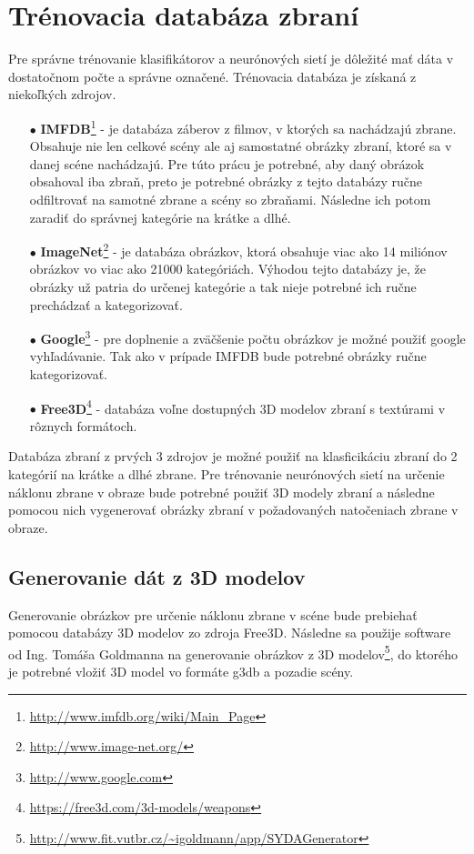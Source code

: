 
\section{Trénovacia databáza zbraní}
\label{sec:databaza}
Pre správne trénovanie klasifikátorov a neurónových sietí je dôležité mať dáta v dostatočnom počte a správne označené.
Trénovacia databáza je získaná z niekoľkých zdrojov.
\begin{enumerate}
    \item[$\bullet$] \textbf{IMFDB}\footnote{\url{http://www.imfdb.org/wiki/Main_Page}} - je databáza záberov z filmov, v ktorých sa nachádzajú zbrane.
    Obsahuje nie len celkové scény ale aj samostatné obrázky zbraní, ktoré sa v danej scéne nachádzajú.
    Pre túto prácu je potrebné, aby daný obrázok obsahoval iba zbraň, preto je potrebné obrázky z tejto databázy ručne odfiltrovať na samotné zbrane a scény so zbraňami.
    Následne ich potom zaradiť do správnej kategórie na krátke a dlhé.
    \item[$\bullet$] \textbf{ImageNet}\footnote{\url{http://www.image-net.org/}} - je databáza obrázkov, ktorá obsahuje viac ako 14 miliónov obrázkov vo viac ako 21000 kategóriách.
    Výhodou tejto databázy je, že obrázky už patria do určenej kategórie a tak nieje potrebné ich ručne prechádzať a kategorizovať.
    \item[$\bullet$] \textbf{Google}\footnote{\url{http://www.google.com}} - pre doplnenie a zväčšenie počtu obrázkov je možné použiť google vyhľadávanie.
    Tak ako v prípade IMFDB bude potrebné obrázky ručne kategorizovať.
    \item[$\bullet$] \textbf{Free3D}\footnote{\url{https://free3d.com/3d-models/weapons}} - databáza voľne dostupných 3D modelov zbraní s textúrami v rôznych formátoch.
\end{enumerate}

Databáza zbraní z prvých 3 zdrojov je možné použiť na klasficikáciu zbraní do 2 kategórií na krátke a dlhé zbrane.
Pre trénovanie neurónových sietí na určenie náklonu zbrane v obraze bude potrebné použiť 3D modely zbraní a následne pomocou nich vygenerovať
    obrázky zbraní v požadovaných natočeniach zbrane v obraze.

\subsection{Generovanie dát z 3D modelov}
\label{subsec:generovanie3d}
Generovanie obrázkov pre určenie náklonu zbrane v scéne bude prebiehať pomocou databázy 3D modelov zo zdroja Free3D.
Následne sa použije software od Ing. Tomáša Goldmanna na generovanie obrázkov z 3D modelov\footnote{\url{http://www.fit.vutbr.cz/~igoldmann/app/SYDAGenerator}},
    do ktorého je potrebné vložiť 3D model vo formáte g3db a pozadie scény.

